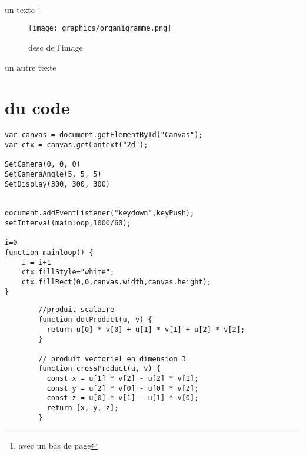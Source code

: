 
un texte \footnote{avec un bas de page}
\begin{figure}[H]
  \centering
  \texttt{[image: graphics/organigramme.png]}
  \caption{desc de l'image}
  \label{structure_capital}
\end{figure}
un autre texte

\section{du code}

\begin{verbatim}
var canvas = document.getElementById("Canvas");
var ctx = canvas.getContext("2d");

SetCamera(0, 0, 0)
SetCameraAngle(5, 5, 5)
SetDisplay(300, 300, 300)


document.addEventListener("keydown",keyPush);
setInterval(mainloop,1000/60);

i=0
function mainloop() {
	i = i+1
    ctx.fillStyle="white";
    ctx.fillRect(0,0,canvas.width,canvas.height);
}
\end{verbatim}

\begin{code}
    \begin{verbatim}
        //produit scalaire 
        function dotProduct(u, v) {
          return u[0] * v[0] + u[1] * v[1] + u[2] * v[2];
        }
        
        // produit vectoriel en dimension 3
        function crossProduct(u, v) {
          const x = u[1] * v[2] - u[2] * v[1];
          const y = u[2] * v[0] - u[0] * v[2];
          const z = u[0] * v[1] - u[1] * v[0];
          return [x, y, z];
        }
    \end{verbatim}
    
    \label{code:crossproduct_and_dotproduct}
\end{code}